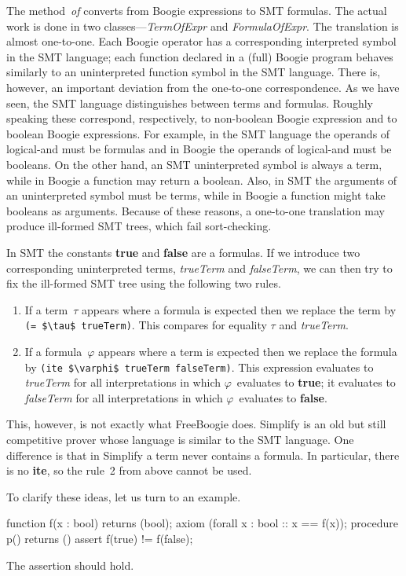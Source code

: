 \documentclass{llncs}
\newcommand{\smtCode}{\lstinline[style=smt,basicstyle=\normalsize]}
\begin{document}
The method~\textit{of} converts from Boogie expressions
to SMT formulas. The actual work is done in two
classes---\textit{TermOfExpr} and \textit{FormulaOfExpr}. The
translation is almost one-to-one. Each Boogie operator has a
corresponding interpreted symbol in the SMT language; each
function declared in a (full) Boogie program behaves similarly
to an uninterpreted function symbol in the SMT language.
There is, however, an important deviation from the one-to-one
correspondence. As we have seen, the SMT language distinguishes
between terms and formulas. Roughly speaking these correspond,
respectively, to non-boolean Boogie expression and to boolean
Boogie expressions. For example, in the SMT language the
operands of logical-and must be formulas and in Boogie the
operands of logical-and must be booleans. On the other hand, an
SMT uninterpreted symbol is always a term, while in Boogie a
function may return a boolean. Also, in SMT the arguments of an
uninterpreted symbol must be terms, while in Boogie a function
might take booleans as arguments. Because of these reasons, a
one-to-one translation may produce ill-formed SMT trees, which
fail sort-checking.

In SMT the constants \textbf{true} and \textbf{false} are a
formulas. If we introduce two corresponding uninterpreted terms,
\textit{trueTerm} and \textit{falseTerm}, we can then try to fix
the ill-formed SMT tree using the following two rules.
\begin{enumerate}
\item If a term~$\tau$ appears where a formula is expected then we 
  replace the term by \smtCode|(= $\tau$ trueTerm)|. This compares
  for equality $\tau$ and \textit{trueTerm}.
\item If a formula~$\varphi$ appears where a term is expected
  then we replace the formula by 
  \smtCode|(ite $\varphi$ trueTerm falseTerm)|.
  This expression evaluates to \textit{trueTerm} for all 
  interpretations in which $\varphi$~evaluates to \textbf{true};
  it evaluates to \textit{falseTerm} for all interpretations
  in which $\varphi$~evaluates to \textbf{false}.
\end{enumerate}
This, however, is not exactly what FreeBoogie does.
Simplify is an old but still competitive prover whose language is
similar to the SMT language. One difference is that in Simplify
a term never contains a formula. In particular, there is no
\textbf{ite}, so the rule~2 from above cannot be used.

To clarify these ideas, let us turn to an example.
\begin{boogie}
function f(x : bool) returns (bool);
axiom (forall x : bool :: x == f(x));
procedure p() returns () { assert f(true) != f(false); }
\end{boogie}
The assertion should hold. 
\end{document}
